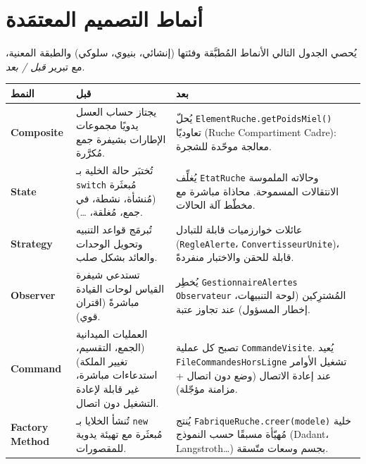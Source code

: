 \section{أنماط التصميم المعتمَدة}
يُحصي الجدول التالي الأنماط المُطبَّقة وفئتها (إنشائي، بنيوي، سلوكي) والطبقة
المعنية، مع تبرير \emph{قبل / بعد}.

\begin{xltabular}{\textwidth}{>{\bfseries}p{2.7cm} p{5.9cm} X}
\toprule
\textbf{النمط} & \textbf{قبل} & \textbf{بعد} \\
\midrule
\endhead
Composite  &
يجتاز حساب العسل يدويًا مجموعات الإطارات بشيفرة جمع مُكرَّرة. &
يُحلّ \texttt{ElementRuche.getPoidsMiel()} تعاوديًا (Ruche \textrightarrow{}
Compartiment \textrightarrow{} Cadre): معالجة موحّدة للشجرة. \\
State  &
تُختبَر حالة الخلية بـ \texttt{switch} مُبعثَرة (مُنشأة، نشطة، في جمع، مُغلقة،
\ldots). &
يُغلِّف \texttt{EtatRuche} وحالاته الملموسة الانتقالات المسموحة. محاذاة مباشرة
مع مخطّط آلة الحالات. \\
Strategy  &
تُبرمَج قواعد التنبيه وتحويل الوحدات والعائد بشكل صلب. &
عائلات خوارزميات قابلة للتبادل (\texttt{RegleAlerte}، \texttt{ConvertisseurUnite})،
قابلة للحقن والاختبار منفردةً. \\
Observer  &
تستدعي شيفرة القياس لوحات القيادة مباشرةً (اقتران قوي). &
يُخطِر \texttt{GestionnaireAlertes} \texttt{Observateur} المُشترِكين (لوحة
التنبيهات، إخطار المسؤول) عند تجاوز عتبة. \\
Command  &
العمليات الميدانية (الجمع، التقسيم، تغيير الملكة) استدعاءات مباشرة، غير قابلة
لإعادة التشغيل دون اتصال. &
تصبح كل عملية \texttt{CommandeVisite}. يُعيد \texttt{FileCommandesHorsLigne}
تشغيل الأوامر عند إعادة الاتصال (وضع دون اتصال + مزامنة مؤجّلة). \\
Factory Method  &
تُنشأ الخلايا بـ \texttt{new} مُبعثَرة مع تهيئة يدوية للمقصورات. &
يُنتج \texttt{FabriqueRuche.creer(modele)} خلية مُهيّأة مسبقًا حسب النموذج
(Dadant، Langstroth\ldots) بجسم وسعات متّسقة. \\

\end{xltabular}
